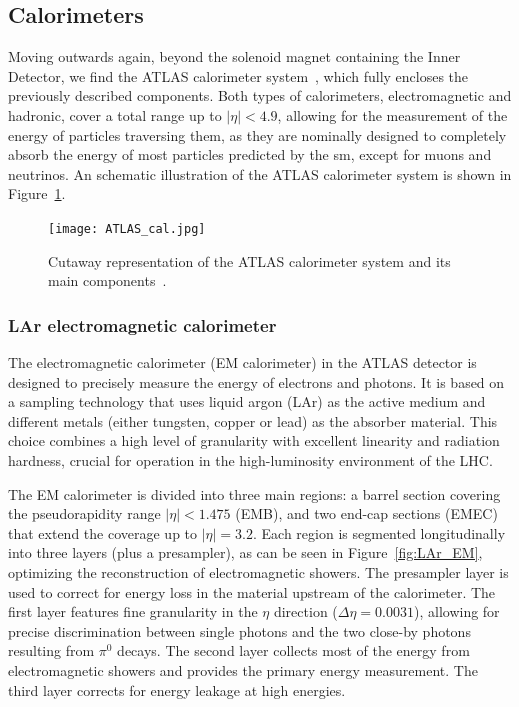 \subsection{Calorimeters}
\label{sec:calo}
Moving outwards again, beyond the solenoid magnet containing the Inner Detector, we find the ATLAS calorimeter system~\cite{lar_tech,tile_tech}, which fully encloses the previously described 
components. Both types of calorimeters, electromagnetic and hadronic, cover a total range up to $|\eta| < 4.9$, allowing for the measurement of the energy of particles traversing them, 
as they are nominally designed to completely absorb the energy of most particles predicted by the \acrshort{sm}, 
except for muons and neutrinos. An schematic illustration of the ATLAS calorimeter system is shown in Figure~\ref{fig:cal}.
\begin{figure}[htbp]
    \centering
        \texttt{[image: ATLAS\_cal.jpg]}
    \caption{Cutaway representation of the ATLAS calorimeter system and its main components~\cite{Collaboration:2723878}.}
    \label{fig:cal}
\end{figure}

\subsubsection{LAr electromagnetic calorimeter}
\label{sec:elelar}

The electromagnetic calorimeter (EM calorimeter) in the ATLAS detector is designed to precisely measure the energy of electrons and photons. It is based on a sampling technology that uses liquid argon (LAr) as the active medium and different metals (either tungsten, copper or lead) as the absorber material. This choice combines a high level of granularity with excellent linearity and radiation hardness, crucial for operation in the high-luminosity environment of the LHC.

The EM calorimeter is divided into three main regions: a barrel section covering the pseudorapidity range $|\eta| < 1.475$ (EMB), and two end-cap sections (EMEC) that extend the coverage up to $|\eta| = 3.2$. Each region is segmented longitudinally into three layers (plus a presampler), as can be seen in Figure~\ref{fig:LAr_EM}, optimizing the reconstruction of electromagnetic showers. The presampler layer is used to correct for energy loss in the material upstream of the calorimeter. The first layer features fine granularity in the $\eta$ direction ($\Delta\eta = 0.0031$), allowing for precise discrimination between single photons and the two close-by photons resulting from $\pi^0$ decays. The second layer collects most of the energy from electromagnetic showers and provides the primary energy measurement. The third layer corrects for energy leakage at high energies.

